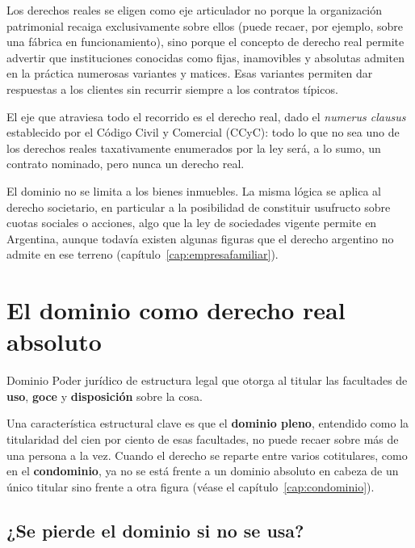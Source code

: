 \documentclass[12pt,oneside]{book}
\begin{document}
Los derechos reales se eligen como eje articulador no porque la organización patrimonial recaiga exclusivamente sobre ellos (puede recaer, por ejemplo, sobre una fábrica en funcionamiento), sino porque el concepto de derecho real permite advertir que instituciones conocidas como fijas, inamovibles y absolutas admiten en la práctica numerosas variantes y matices. Esas variantes permiten dar respuestas a los clientes sin recurrir siempre a los contratos típicos.

\begin{note}
El eje que atraviesa todo el recorrido es el derecho real, dado el \emph{numerus clausus} establecido por el Código Civil y Comercial (CCyC): todo lo que no sea uno de los derechos reales taxativamente enumerados por la ley será, a lo sumo, un contrato nominado, pero nunca un derecho real.
\end{note}

\begin{important}
El dominio no se limita a los bienes inmuebles. La misma lógica se aplica al derecho societario, en particular a la posibilidad de constituir usufructo sobre cuotas sociales o acciones, algo que la ley de sociedades vigente permite en Argentina, aunque todavía existen algunas figuras que el derecho argentino no admite en ese terreno (capítulo~\ref{cap:empresafamiliar}).
\end{important}

\section{El dominio como derecho real absoluto}
\label{sec:dominio-absoluto}

\begin{definition}{Dominio}
Poder jurídico de estructura legal que otorga al titular las facultades de \textbf{uso}, \textbf{goce} y \textbf{disposición} sobre la cosa.
\end{definition}

Una característica estructural clave es que el \textbf{dominio pleno}, entendido como la titularidad del cien por ciento de esas facultades, no puede recaer sobre más de una persona a la vez. Cuando el derecho se reparte entre varios cotitulares, como en el \textbf{condominio}, ya no se está frente a un dominio absoluto en cabeza de un único titular sino frente a otra figura (véase el capítulo~\ref{cap:condominio}).

\subsection{¿Se pierde el dominio si no se usa?}
\end{document}
